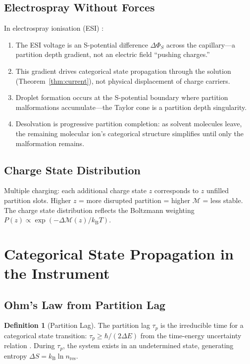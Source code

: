 \documentclass[11pt,twocolumn,a4paper]{article}
\theoremstyle{definition}
\newtheorem{definition}[theorem]{Definition}
\theoremstyle{remark}
\newcommand{\kB}{k_{\mathrm{B}}}
\newcommand{\Depth}{\mathcal{M}}
\newcommand{\taup}{\tau_p}
\newcommand{\Spotential}{\Phi_S}
\begin{document}
\subsection{Electrospray Without Forces}

In electrospray ionisation (ESI) \citep{fenn1989}:

\begin{enumerate}[nosep]
\item The ESI voltage is an S-potential difference $\Delta\Spotential$ across the capillary---a partition depth gradient, not an electric field ``pushing charges.''
\item This gradient drives categorical state propagation through the solution (Theorem~\ref{thm:current}), not physical displacement of charge carriers.
\item Droplet formation occurs at the S-potential boundary where partition malformations accumulate---the Taylor cone is a partition depth singularity.
\item Desolvation is progressive partition completion: as solvent molecules leave, the remaining molecular ion's categorical structure simplifies until only the malformation remains.
\end{enumerate}

\subsection{Charge State Distribution}

Multiple charging: each additional charge state $z$ corresponds to $z$ unfilled partition slots. Higher $z$ = more disrupted partition = higher $\Depth$ = less stable. The charge state distribution reflects the Boltzmann weighting $P(z) \propto \exp(-\Delta\Depth(z)/\kB T)$.

\section{Categorical State Propagation in the Instrument}
\label{sec:transport}

\subsection{Ohm's Law from Partition Lag}

\begin{definition}[Partition Lag]
The partition lag $\taup$ is the irreducible time for a categorical state transition: $\taup \geq \hbar/(2\Delta E)$ from the time-energy uncertainty relation \citep{mandelstam1991, heisenberg1927}. During $\taup$, the system exists in an undetermined state, generating entropy $\Delta S = \kB \ln n_{\mathrm{res}}$.
\end{definition}
\end{document}
